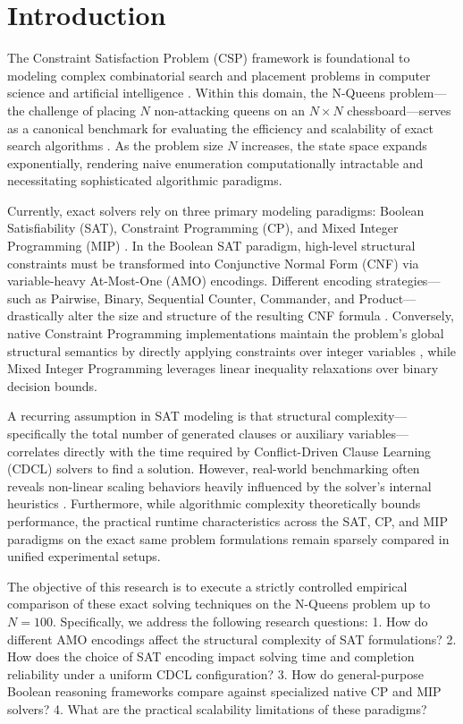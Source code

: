 \section{Introduction}
\label{sec:intro}

The Constraint Satisfaction Problem (CSP) framework is foundational to modeling complex combinatorial search and placement problems in computer science and artificial intelligence \citep{russell2010artificial}. Within this domain, the N-Queens problem---the challenge of placing $N$ non-attacking queens on an $N \times N$ chessboard---serves as a canonical benchmark for evaluating the efficiency and scalability of exact search algorithms \citep{bell2009solving}. As the problem size $N$ increases, the state space expands exponentially, rendering naive enumeration computationally intractable and necessitating sophisticated algorithmic paradigms.

Currently, exact solvers rely on three primary modeling paradigms: Boolean Satisfiability (SAT), Constraint Programming (CP), and Mixed Integer Programming (MIP) \citep{gomes2008satisfiability, rossi2006handbook, wolsey2020integer}. In the Boolean SAT paradigm, high-level structural constraints must be transformed into Conjunctive Normal Form (CNF) via variable-heavy At-Most-One (AMO) encodings. Different encoding strategies---such as Pairwise, Binary, Sequential Counter, Commander, and Product---drastically alter the size and structure of the resulting CNF formula \citep{sinz2005towards, frisch2005sat}. Conversely, native Constraint Programming implementations maintain the problem's global structural semantics by directly applying constraints over integer variables \citep{regin1994filtering}, while Mixed Integer Programming leverages linear inequality relaxations over binary decision bounds.

A recurring assumption in SAT modeling is that structural complexity---specifically the total number of generated clauses or auxiliary variables---correlates directly with the time required by Conflict-Driven Clause Learning (CDCL) solvers to find a solution. However, real-world benchmarking often reveals non-linear scaling behaviors heavily influenced by the solver's internal heuristics \citep{marques2009conflict}. Furthermore, while algorithmic complexity theoretically bounds performance, the practical runtime characteristics across the SAT, CP, and MIP paradigms on the exact same problem formulations remain sparsely compared in unified experimental setups.

The objective of this research is to execute a strictly controlled empirical comparison of these exact solving techniques on the N-Queens problem up to $N=100$. Specifically, we address the following research questions:
1. How do different AMO encodings affect the structural complexity of SAT formulations?
2. How does the choice of SAT encoding impact solving time and completion reliability under a uniform CDCL configuration?
3. How do general-purpose Boolean reasoning frameworks compare against specialized native CP and MIP solvers?
4. What are the practical scalability limitations of these paradigms?

